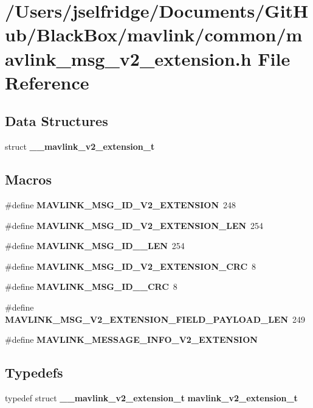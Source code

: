 \section{/\+Users/jselfridge/\+Documents/\+Git\+Hub/\+Black\+Box/mavlink/common/mavlink\+\_\+msg\+\_\+v2\+\_\+extension.h File Reference}
\label{mavlink__msg__v2__extension_8h}
\subsection*{Data Structures}
\begin{DoxyCompactItemize}
\item 
struct \textbf{ \+\_\+\+\_\+mavlink\+\_\+v2\+\_\+extension\+\_\+t}
\end{DoxyCompactItemize}
\subsection*{Macros}
\begin{DoxyCompactItemize}
\item 
\#define \textbf{ M\+A\+V\+L\+I\+N\+K\+\_\+\+M\+S\+G\+\_\+\+I\+D\+\_\+\+V2\+\_\+\+E\+X\+T\+E\+N\+S\+I\+ON}~248
\item 
\#define \textbf{ M\+A\+V\+L\+I\+N\+K\+\_\+\+M\+S\+G\+\_\+\+I\+D\+\_\+\+V2\+\_\+\+E\+X\+T\+E\+N\+S\+I\+O\+N\+\_\+\+L\+EN}~254
\item 
\#define \textbf{ M\+A\+V\+L\+I\+N\+K\+\_\+\+M\+S\+G\+\_\+\+I\+D\+\_\+\_\+\+L\+EN}~254
\item 
\#define \textbf{ M\+A\+V\+L\+I\+N\+K\+\_\+\+M\+S\+G\+\_\+\+I\+D\+\_\+\+V2\+\_\+\+E\+X\+T\+E\+N\+S\+I\+O\+N\+\_\+\+C\+RC}~8
\item 
\#define \textbf{ M\+A\+V\+L\+I\+N\+K\+\_\+\+M\+S\+G\+\_\+\+I\+D\+\_\+\_\+\+C\+RC}~8
\item 
\#define \textbf{ M\+A\+V\+L\+I\+N\+K\+\_\+\+M\+S\+G\+\_\+\+V2\+\_\+\+E\+X\+T\+E\+N\+S\+I\+O\+N\+\_\+\+F\+I\+E\+L\+D\+\_\+\+P\+A\+Y\+L\+O\+A\+D\+\_\+\+L\+EN}~249
\item 
\#define \textbf{ M\+A\+V\+L\+I\+N\+K\+\_\+\+M\+E\+S\+S\+A\+G\+E\+\_\+\+I\+N\+F\+O\+\_\+\+V2\+\_\+\+E\+X\+T\+E\+N\+S\+I\+ON}
\end{DoxyCompactItemize}
\subsection*{Typedefs}
\begin{DoxyCompactItemize}
\item 
typedef struct \textbf{ \+\_\+\+\_\+mavlink\+\_\+v2\+\_\+extension\+\_\+t} \textbf{ mavlink\+\_\+v2\+\_\+extension\+\_\+t}
\end{DoxyCompactItemize}


